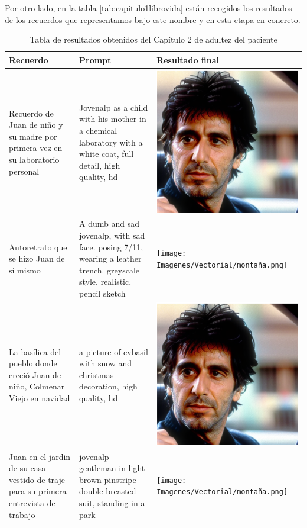 Por otro lado, en la tabla \ref*{tab:capitulo1librovida} están recogidos los resultados de los recuerdos que representamos bajo este nombre y en esta etapa en concreto. \\

 \begin{table}
	\centering
	\begin{tabular}{>{\centering\arraybackslash}m{5cm} >{\arraybackslash}m{5cm}>{\arraybackslash}m{5cm}}
		\textbf{Recuerdo} & \textbf{Prompt} & \textbf{Resultado final} \\
		\hline
		Recuerdo de Juan de niño y su madre por primera vez en su laboratorio personal & Jovenalp as a child with his mother in a chemical laboratory with a white coat, full detail, high quality, hd & \includegraphics[width = 0.3
		\textwidth]{Imagenes/Vectorial/padultalp.png}\\
		\hline
		Autoretrato que se hizo Juan de sí mismo &A dumb and sad jovenalp, with sad face. posing 7/11, wearing a leather trench. greyscale style, realistic, pencil sketch & \texttt{[image: Imagenes/Vectorial/montaña.png]}\\
		\hline
		La basílica del pueblo donde creció Juan de niño, Colmenar Viejo en navidad & a picture of cvbasil with snow and christmas decoration, high quality, hd & \includegraphics[width = 0.3
		\textwidth]{Imagenes/Vectorial/padultalp.png}\\
		\hline
		Juan en el jardin de su casa vestido de traje para su primera entrevista de trabajo & jovenalp gentleman in light brown pinstripe double breasted suit, standing in a park & \texttt{[image: Imagenes/Vectorial/montaña.png]}\\
		\hline
	\end{tabular}
	\caption{Tabla de resultados obtenidos del Capítulo 2 de adultez del paciente}
	\label{tab:capitulo2librovida}
\end{table}
 
